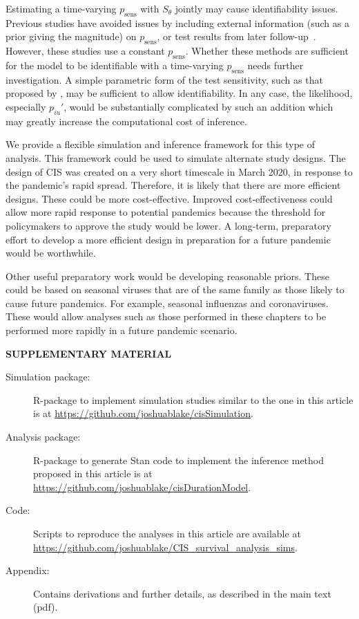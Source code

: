 \documentclass[12pt]{article}
\newcommand{\psens}{p_\text{sens}}
\begin{document}
Estimating a time-varying $\psens$ with $S_\theta$ jointly may cause identifiability issues.
Previous studies have avoided issues by including external information (such as a prior giving the magnitude) on $\psens$, or test results from later follow-up~\citep[and references therein]{piresIntervalMisclassify}.
However, these studies use a constant $\psens$.
Whether these methods are sufficient for the model to be identifiable with a time-varying $\psens$ needs further investigation.
A simple parametric form of the test sensitivity, such as that proposed by \citet{brownBayesian}, may be sufficient to allow identifiability.
In any case, the likelihood, especially $p_{iu}'$, would be substantially complicated by such an addition which may greatly increase the computational cost of inference.

We provide a flexible simulation and inference framework for this type of analysis.
This framework could be used to simulate alternate study designs.
The design of CIS was created on a very short timescale in March 2020, in response to the pandemic's rapid spread.
Therefore, it is likely that there are more efficient designs.
These could be more cost-effective.
Improved cost-effectiveness could allow more rapid response to potential pandemics because the threshold for policymakers to approve the study would be lower.
A long-term, preparatory effort to develop a more efficient design in preparation for a future pandemic would be worthwhile.

Other useful preparatory work would be developing reasonable priors.
These could be based on seasonal viruses that are of the same family as those likely to cause future pandemics.
For example, seasonal influenzas and coronaviruses.
These would allow analyses such as those performed in these chapters to be performed more rapidly in a future pandemic scenario.






\bigskip
\begin{center}
{\large\bf SUPPLEMENTARY MATERIAL}
\end{center}

\begin{description}

\item[Simulation package:] R-package to implement simulation studies similar to the one in this article is at \url{https://github.com/joshuablake/cisSimulation}.

\item[Analysis package:] R-package to generate Stan code to implement the inference method proposed in this article is at \url{https://github.com/joshuablake/cisDurationModel}.

\item[Code:] Scripts to reproduce the analyses in this article are available at \url{https://github.com/joshuablake/CIS_survival_analysis_sims}.

\item[Appendix:] Contains derivations and further details, as described in the main text (pdf).

\end{description}
\end{document}
